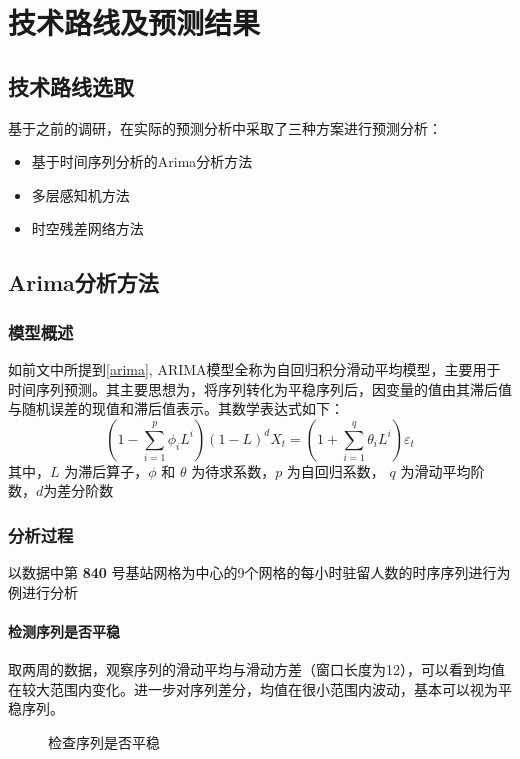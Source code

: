 
\chapter{技术路线及预测结果} 
\label{Chapter3}  
\section{技术路线选取}
基于之前的调研，在实际的预测分析中采取了三种方案进行预测分析：
\begin{itemize}
	\item 基于时间序列分析的Arima分析方法
	\item 多层感知机方法
	\item 时空残差网络方法
\end{itemize}
\section{Arima分析方法}
\subsection{模型概述}
如前文中所提到\ref{arima}, ARIMA模型全称为自回归积分滑动平均模型，主要用于时间序列预测。其主要思想为，将序列转化为平稳序列后，因变量的值由其滞后值与随机误差的现值和滞后值表示\cite{10.1007/978-981-10-8636-6_34}。其数学表达式如下：
\begin{equation}
\left( 1 - \sum _ { i = 1 } ^ { p } \phi _ { i } L ^ { i } \right) ( 1 - L ) ^ { d } X _ { t } = \left( 1 + \sum _ { i = 1 } ^ { q } \theta _ { i } L ^ { i } \right) \varepsilon _ { t }
\end{equation}
其中，$L$ 为滞后算子，$\phi$ 和 $\theta$ 为待求系数，$p$ 为自回归系数， $q$ 为滑动平均阶数，$d$为差分阶数
\subsection{分析过程}
以数据中第 \textbf{840} 号基站网格为中心的9个网格的每小时驻留人数的时序序列进行为例进行分析
\subsubsection*{检测序列是否平稳}
取两周的数据，观察序列的滑动平均与滑动方差（窗口长度为12），可以看到均值在较大范围内变化。进一步对序列差分，均值在很小范围内波动，基本可以视为平稳序列。
\begin{figure}[ht]
\centering
{}
\hfill
\caption{检查序列是否平稳}
\label{fig:ARIMA1}
\end{figure}

